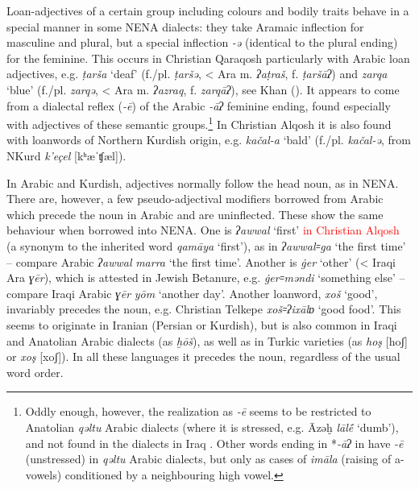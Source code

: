 \documentclass[output=paper]{langsci/langscibook}
\begin{document}
Loan-adjectives of a certain group including colours and bodily traits behave in a special manner in some NENA dialects: they take Aramaic inflection for masculine and plural, but a special inflection \textit{\nobreakdash-ə} (identical to the plural ending) for the feminine. This occurs in Christian Qaraqosh particularly with Arabic loan adjectives, e.g. \textit{ṭarša} ‘deaf’ (f./pl. \textit{ṭaršə}, < Ara m. \textit{ʔaṭraš}, f. \textit{ṭaršāʔ}) and \textit{zarqa} ‘blue’ (f./pl. \textit{zarqə}, < Ara m. \textit{ʔazraq}, f. \textit{zarqāʔ}), see Khan (\citeyear[219]{Khan2002}). It appears to come from a dialectal reflex (\textit{\nobreakdash-ē}) of the Arabic \textit{\nobreakdash-āʔ} feminine ending, found especially with adjectives of these semantic groups.\footnote{Oddly enough, however, the realization as \textit{{}-ē} seems to be restricted to Anatolian \textit{qəltu} Arabic dialects (where it is stressed, e.g. Āzəḫ \textit{lāl\'{ē}} ‘dumb’), and not found in the dialects in Iraq \citep[76]{Jastrow1978}. Other words ending in *\textit{{}-āʔ} in have \textit{{}-ē} (unstressed) in \textit{qəltu} Arabic dialects, but only as cases of \textit{imāla} (raising of a-vowels) conditioned by a neighbouring high vowel.}  In Christian Alqosh it is also found with loanwords of Northern Kurdish origin, e.g. \textit{kačal-a} ‘bald’ (f./pl. \textit{kačal\nobreakdash-ə}, from NKurd \textit{k’eçel} [kʰæˈʧæl]).

In Arabic and Kurdish, adjectives normally follow the head noun, as in NENA. There are, however, a few pseudo-adjectival modifiers borrowed from Arabic which precede the noun in Arabic and are uninflected. These show the same behaviour when borrowed into NENA. One is \textit{ʔawwal} ‘first’ \textcolor{red}{in Christian Alqosh} (a synonym to the inherited word \textit{qamāya} ‘first’), as in \textit{ʔawwal꞊ga} ‘the first time’ – compare Arabic \textit{ʔawwal} \textit{marra} ‘the first time’. Another is \textit{\.ger} ‘other’ (< Iraqi Ara \textit{ɣēr}), which is attested in Jewish Betanure, e.g. \textit{\.ger꞊məndi} ‘something else’ \citep[105]{Mutzafi2008} – compare Iraqi Arabic \textit{ɣēr} \textit{yōm} ‘another day’. Another loanword, \textit{xoš} ‘good’, invariably precedes the noun, e.g. Christian Telkepe \textit{xoš꞊ʔixālɒ} ‘good food’. This seems to originate in Iranian (Persian or Kurdish), but is also common in Iraqi and Anatolian Arabic dialects (as \textit{ḫōš}), as well as in Turkic varieties (as \textit{hoş} [hoʃ] or \textit{xoş} [xoʃ]). In all these languages it precedes the noun, regardless of the usual word order.
\end{document}
